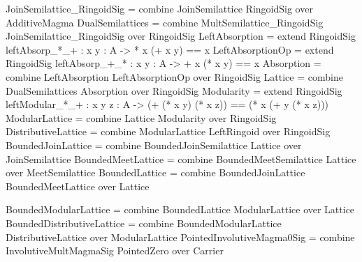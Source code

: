 \begin{togcode} 
JoinSemilattice_RingoidSig = 
  combine JoinSemilattice {} RingoidSig {} over AdditiveMagma
DualSemilattices = 
  combine MultSemilattice_RingoidSig {} JoinSemilattice_RingoidSig {} 
  over RingoidSig
LeftAbsorption = 
  extend RingoidSig {leftAbsorp_*_+ : {x y : A} -> * x (+ x y) == x}
LeftAbsorptionOp = 
  extend RingoidSig {leftAbsorp_+_* : {x y : A} -> + x (* x y) == x}  
Absorption = 
  combine LeftAbsorption {} LeftAbsorptionOp {} over RingoidSig
Lattice = combine DualSemilattices {} Absorption {} over RingoidSig
Modularity = 
  extend RingoidSig { leftModular_*_+ : {x y z : A} -> 
       (+ (* x y) (* x z)) == (* x (+ y (* x z))) }
ModularLattice = combine Lattice {} Modularity {} over RingoidSig
DistributiveLattice = 
  combine ModularLattice {} LeftRingoid {} over RingoidSig
BoundedJoinLattice = 
  combine BoundedJoinSemilattice {} Lattice {} over JoinSemilattice
BoundedMeetLattice = 
  combine BoundedMeetSemilattice {} Lattice {} over MeetSemilattice
BoundedLattice = 
  combine BoundedJoinLattice {} BoundedMeetLattice {} over Lattice
\end{togcode} 

\begin{togcode} 
BoundedModularLattice = 
  combine BoundedLattice {} ModularLattice {} over Lattice
BoundedDistributiveLattice = 
  combine BoundedModularLattice {} DistributiveLattice {} 
  over ModularLattice
PointedInvolutiveMagma0Sig = 
  combine InvolutiveMultMagmaSig {} PointedZero {} over Carrier
\end{togcode} 

